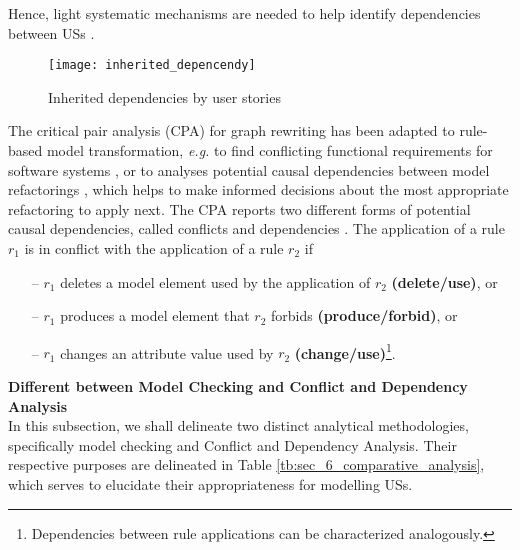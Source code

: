 Hence, light systematic mechanisms are needed to help identify dependencies between USs \cite{gomez2010systematic}.
\begin{figure}
\center
\texttt{[image: inherited\_depencendy]}
\caption{  Inherited dependencies by user stories\cite{gomez2010systematic} }\label{fig:inherited_dependencies}
\end{figure}
The critical pair analysis (CPA) for graph rewriting \cite{hartmanis2006monographs} has been adapted to rule-based model transformation, \emph{e.g.} to find conflicting functional requirements for software systems \cite{hausmann2002detection}, or to analyses potential causal dependencies between model refactorings \cite{mens2007analysing}, which helps to make informed decisions about the most appropriate refactoring to apply next. The CPA reports two different forms of potential causal dependencies, called conflicts and dependencies \cite{born2015analyzing}.
The application of a rule $r_1$ is in conflict with the application of a rule $r_2$ if
\begin{itemize}
\item[--] $r_1$ deletes a model element used by the application of $r_2$ \textbf{(delete/use)}, or
\item[--] $r_1$ produces a model element that $r_2$ forbids \textbf{(produce/forbid)}, or
\item[--] $r_1$ changes an attribute value used by $r_2$ \textbf{(change/use)}\footnote{Dependencies between rule applications can be characterized analogously.}. 
\end{itemize}
\textbf{Different between Model Checking and Conflict and Dependency Analysis}\\ 
In this subsection, we shall delineate two distinct analytical methodologies, specifically model checking and Conflict and Dependency Analysis. Their respective purposes are delineated in Table \ref{tb:sec_6_comparative_analysis}, which serves to elucidate their appropriateness for modelling USs.

